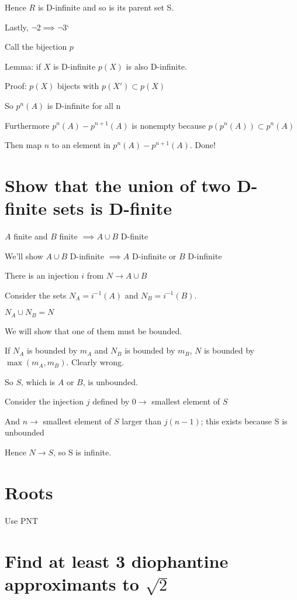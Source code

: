 \documentclass{article}
\begin{document}
Hence $R$ is D-infinite and so is its parent set S.

Lastly, $\lnot 2 \implies \lnot 3$`

Call the bijection $p$

Lemma: if $X$ is D-infinite $p(X)$ is also D-infinite.

Proof: $p(X)$ bijects with $p(X') \subset p(X)$

So $p^n(A)$ is D-infinite for all n

Furthermore $p^n(A) - p^{n+1}(A)$ is nonempty because $p(p^n(A)) \subset p^n(A)$

Then map $n$ to an element in $p^n(A) - p^{n+1}(A)$. Done!

\section{Show that the union of two D-finite sets is D-finite}

$A$ finite and $B$ finite $\implies A \cup B$ D-finite

We'll show $A \cup B$ D-infinite $\implies A$ D-infinite or $B$ D-infinite

There is an injection $i$ from $N \rightarrow A \cup B$

Consider the sets $N_A = i^{-1}(A)$ and $N_B = i^{-1}(B)$.

$N_A \cup N_B = N$

We will show that one of them must be bounded.

If $N_A$ is bounded by $m_A$ and $N_B$ is bounded by $m_B$, $N$ is bounded by $\max(m_A, m_B)$. Clearly wrong.

So $S$, which is $A$ or $B$, is unbounded.

Consider the injection $j$ defined by $0 \rightarrow$ smallest element of $S$

And $n \rightarrow$ smallest element of $S$ larger than $j(n-1)$; this exists because S is unbounded

Hence $N \rightarrow S$, so S is infinite.

\section{Roots}

Use PNT

\section{Find at least 3 diophantine approximants to $\sqrt{2}$}
\end{document}
